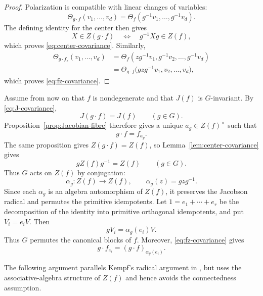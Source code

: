 \documentclass[11pt,reqno]{amsart}
\numberwithin{equation}{section}
\theoremstyle{definition}
\theoremstyle{remark}
\begin{document}
\begin{proof}
Polarization is compatible with linear changes of variables:
\begin{equation*}%
  \Theta_{g\cdot f}(v_1,\ldots,v_d)
  =
  \Theta_f(g^{-1}v_1,\ldots,g^{-1}v_d).
\end{equation*}
The defining identity for the center then gives
\[
  X\in Z(g\cdot f)
  \quad\Longleftrightarrow\quad
  g^{-1}Xg\in Z(f),
\]
which proves \eqref{eq:center-covariance}.  Similarly,
\[
\begin{aligned}
  \Theta_{g\cdot f_z}(v_1,\ldots,v_d)
  &=
  \Theta_f(zg^{-1}v_1,g^{-1}v_2,\ldots,g^{-1}v_d) \\
  &=
  \Theta_{g\cdot f}
  \bigl(gzg^{-1}v_1,v_2,\ldots,v_d\bigr),
\end{aligned}
\]
which proves \eqref{eq:fz-covariance}.
\end{proof}

Assume from now on that $f$ is nondegenerate and that $J(f)$ is
$G$-invariant.  By \eqref{eq:J-covariance},
\[
  J(g\cdot f)=J(f)
  \qquad(g\in G).
\]
Proposition~\ref{prop:Jacobian-fibre} therefore gives a unique
$a_g\in Z(f)^\times$ such that
\begin{equation}\label{eq:unit-ag}
  g\cdot f=f_{a_g}.
\end{equation}
The same proposition gives $Z(g\cdot f)=Z(f)$,  so Lemma~\ref{lem:center-covariance} gives 
\begin{equation}\label{eq:center-conjugation}
  gZ(f)g^{-1}=Z(f)
  \qquad(g\in G).
\end{equation}
Thus $G$ acts on $Z(f)$ by conjugation:
\[
  \alpha_g:Z(f)\longrightarrow Z(f),
  \qquad
  \alpha_g(z)=gzg^{-1}.
\]
Since each $\alpha_g$ is an algebra automorphism of $Z(f)$, it
preserves the Jacobson radical and permutes the primitive
idempotents.  Let $1=e_1+\cdots+e_r$ be the decomposition of the identity into primitive orthogonal
idempotents, and put $V_i=e_iV$. Then
\begin{equation}\label{eq:block-action}
  gV_i
  =
  \alpha_g(e_i)V.
\end{equation}
Thus $G$ permutes the canonical blocks of $f$.  Moreover,
\eqref{eq:fz-covariance} gives
\begin{equation}\label{eq:summand-action}
  g\cdot f_{e_i}
  =
  (g\cdot f)_{\alpha_g(e_i)}.
\end{equation}

The following argument parallels Kempf's radical argument in
\cite[Theorem~12]{Kempf}, but uses the associative-algebra structure
of $Z(f)$ and hence avoids the connectedness assumption.
\end{document}
